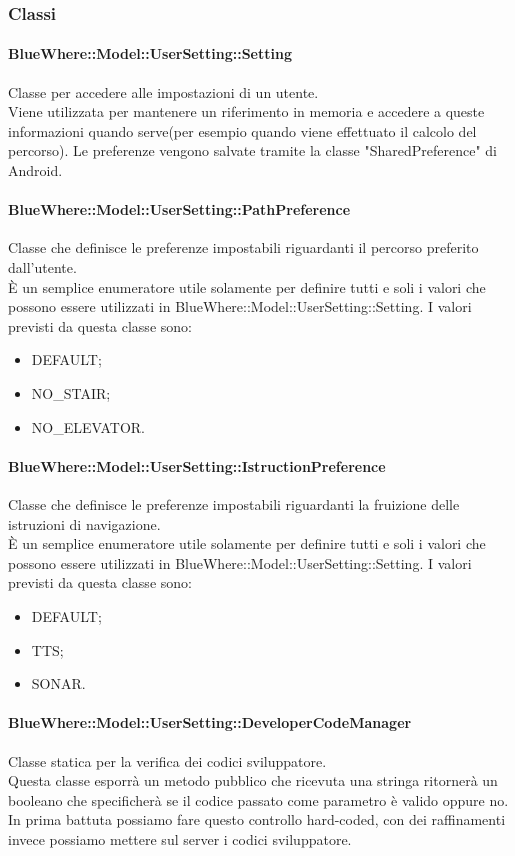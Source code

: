 \documentclass[../SpecificaTecnica.tex]{subfiles}
\begin{document}
		\subsubsection{Classi}
			\paragraph{BlueWhere::Model::UserSetting::Setting}
				Classe per accedere alle impostazioni di un utente. \\
				Viene utilizzata per mantenere un riferimento in memoria e accedere a queste informazioni quando serve(per esempio quando viene effettuato il calcolo del percorso). Le preferenze vengono salvate tramite la classe "SharedPreference" di Android.
			\paragraph{BlueWhere::Model::UserSetting::PathPreference}
				Classe che definisce le preferenze impostabili riguardanti il percorso preferito dall'utente. \\
				È un semplice enumeratore utile solamente per definire tutti e soli i valori che possono essere utilizzati in BlueWhere::Model::UserSetting::Setting.
				I valori previsti da questa classe sono:
				\begin{itemize}
					\item DEFAULT;
					\item NO_STAIR;
					\item NO_ELEVATOR.
				\end{itemize}
			\paragraph{BlueWhere::Model::UserSetting::IstructionPreference}
				Classe che definisce le preferenze impostabili riguardanti la fruizione delle istruzioni di navigazione. \\
				È un semplice enumeratore utile solamente per definire tutti e soli i valori che possono essere utilizzati in BlueWhere::Model::UserSetting::Setting.
				I valori previsti da questa classe sono:
				\begin{itemize}
					\item DEFAULT;
					\item TTS;
					\item SONAR.
				\end{itemize}
			\paragraph{BlueWhere::Model::UserSetting::DeveloperCodeManager}
				Classe statica per la verifica dei codici sviluppatore. \\
				Questa classe esporrà un metodo pubblico che ricevuta una stringa ritornerà un booleano che specificherà se il codice passato come parametro è valido oppure no. In prima battuta possiamo fare questo controllo hard-coded, con dei raffinamenti invece possiamo mettere sul server i codici sviluppatore.
	\newpage
\end{document}
